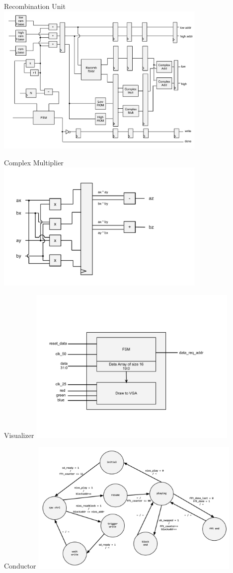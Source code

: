 \documentclass{beamer}
\begin{document}
\begin{frame}{Recombination Unit}
	\centering
	\includegraphics[width=4in]{recombinator}
\end{frame}

\begin{frame}{Complex Multiplier}
	\centering
	\includegraphics[width=4in]{complex-mult}
\end{frame}

\begin{frame}{Visualizer}
	\centering
	\includegraphics[width=4in]{viz_block_diagram}
\end{frame}

\begin{frame}{Conductor}
	\centering
    \includegraphics[width=4in]{conductor_state}
\end{frame}
\end{document}
